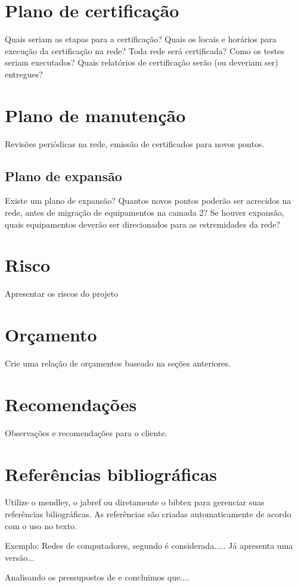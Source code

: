 \documentclass[	DIV=calc,%
							paper=a4,%
							fontsize=12pt,%
							onecolumn]{scrartcl}	 					%
\begin{document}
\section{Plano de certificação}
Quais seriam as etapas para a certificação? 
Quais os locais e horários para execução da certificação na rede? Toda rede será certificada?
Como os testes seriam executados?
Quais relatórios de certificação serão (ou deveriam ser) entregues? 

\section{Plano de manutenção}

Revisões periódicas na rede, emissão de certificados para novos pontos.

\subsection{Plano de expansão}
Existe um plano de expansão? Quantos novos pontos poderão ser acrecidos na rede, antes de migração de equipamentos na camada 2? Se houver expansão, quais equipamentos deverão ser direcionados para as estremidades da rede? 

\section{Risco}
Apresentar os riscos do projeto

\section{Orçamento}
Crie uma relação de orçamentos baseado na seções anteriores.

\section{Recomendações}
Observações e recomendações para o cliente.

\section{Referências bibliográficas}
Utilize o mendley, o jabref ou diretamente o bibtex para gerenciar suas referências biliográficas. As referências são criadas automaticamente de acordo com o uso no texto.

Exemplo: Redes de computadores, segundo \cite{t2013} é considerada..... Já \cite{kurose2010} apresenta uma versão...

Analisando os pressupostos de \cite{ref3} e \cite{ref4} concluimos que....


\renewcommand\refname{} %

  
\end{document}
